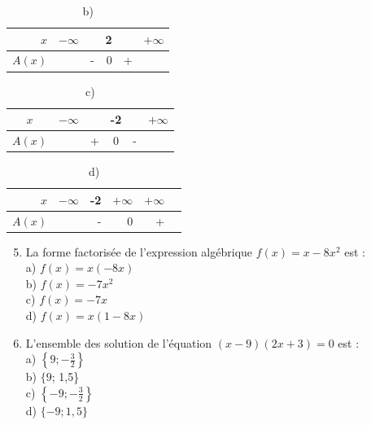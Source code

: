 \documentclass[10pt]{article}
\begin{document}
\begin{table}[h]
\begin{center}
\captionsetup{labelformat=empty}
\caption{b)}
\begin{tabular}{|r|rrrrr|}
\hline
$x$ & $-\infty$ &  & 2 &  & $+\infty$ \\
\hline
$A(x)$ &  & - & 0 & + &  \\
\hline
\end{tabular}
\end{center}
\end{table}

\begin{table}[h]
\begin{center}
\captionsetup{labelformat=empty}
\caption{c)}
\begin{tabular}{|c|ccccc|}
\hline
$x$ & $-\infty$ &  & -2 &  & $+\infty$ \\
\hline
$A(x)$ &  & + & 0 & - &  \\
\hline
\end{tabular}
\end{center}
\end{table}

\begin{table}[h]
\begin{center}
\captionsetup{labelformat=empty}
\caption{d)}
\begin{tabular}{|r|rrrrr|}
\hline
$x$ & $-\infty$ & -2 & $+\infty$ & $+\infty$ &  \\
\hline
$A(x)$ &  & - & 0 & + &  \\
\hline
\end{tabular}
\end{center}
\end{table}

\begin{enumerate}
  \setcounter{enumi}{4}
  \item La forme factorisée de l'expression algébrique $f(x)=x-8 x^{2}$ est :\\
a) $f(x)=x(-8 x)$\\
b) $f(x)=-7 x^{2}$\\
c) $f(x)=-7 x$\\
d) $f(x)=x(1-8 x)$
  \item L'ensemble des solution de l'équation $(x-9)(2 x+3)=0$ est :\\
a) $\left\{9 ;-\frac{3}{2}\right\}$\\
b) $\{9$; 1,5\}\\
c) $\left\{-9 ;-\frac{3}{2}\right\}$\\
d) $\{-9 ; 1,5\}$
\end{enumerate}
\end{document}
